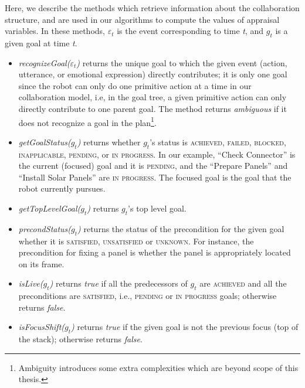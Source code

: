 \documentclass[12pt]{report}
\begin{document}
Here, we describe the methods which retrieve information about the collaboration
structure, and are used in our algorithms to compute the values of appraisal
variables. In these methods, $\varepsilon_t$ is the event corresponding to time
\textit{t}, and $g_t$ is a given goal at time \textit{t}.

\begin{itemize}
  \setlength\itemsep{1mm}
  \item \textit{recognizeGoal($\varepsilon_t$)} returns the unique goal to which
  the given event (action, utterance, or emotional expression) directly
  contributes; it is only one goal since the robot can only do one primitive
  action at a time in our collaboration model, i.e, in the goal tree, a given
  primitive action can only directly contribute to one parent goal. The method
  returns \textit{ambiguous} if it does not recognize a goal in the
  plan\footnote{Ambiguity introduces some extra complexities which are beyond
  scope of this thesis.}.
  
  \item \textit{getGoalStatus($g_t$)} returns whether $g_t$'s status is
  \textsc{achieved, failed, blocked, inapplicable, pending,} or \textsc{in
  progress}. In our example, ``Check Connector'' is the current (focused) goal
  and it is \textsc{pending}, and the ``Prepare Panels'' and ``Install Solar
  Panels'' are \textsc{in progress}. The focused goal is the goal that the robot
  currently pursues.
  
  \item \textit{getTopLevelGoal($g_t$)} returns $g_t$'s top level goal.

  \item \textit{precondStatus($g_t$)} returns the status of the precondition for
  the given goal whether it is \textsc{satisfied, unsatisfied} or
  \textsc{unknown}. For instance, the precondition for fixing a panel is whether
  the panel is appropriately located on its frame.
  
  \item \textit{isLive($g_t$)} returns \textit{true} if all the predecessors of
  $g_t$ are \textsc{achieved} and all the preconditions are \textsc{satisfied},
  i.e., \textsc{pending} or \textsc{in progress} goals; otherwise returns
  \textit{false}.
  
  \item \textit{isFocusShift($g_t$)} returns \textit{true} if the given
  goal is not the previous focus (top of the stack); otherwise returns
  \textit{false}.
  

\end{itemize}
\end{document}
